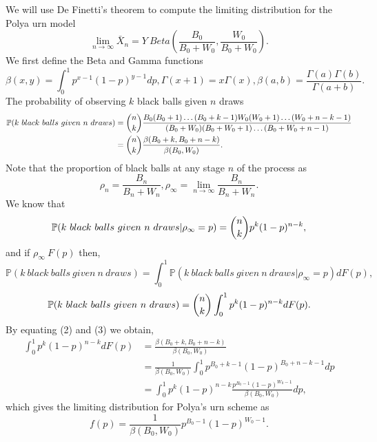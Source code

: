 \documentclass[a4paper,english,12pt]{article}
\begin{document}
We will use De Finetti's theorem to compute the limiting distribution for the Polya urn model 
\begin{equation*}
\lim_{n\to \infty} \bar{X}_n=Y~Beta\left(\frac{B_0}{B_0+W_0},\frac{W_0}{B_0+W_0} \right).
\end{equation*}
We first define the Beta and Gamma functions
\begin{equation*}
\beta(x,y)=\int_0^1 p^{x-1}(1-p)^{y-1}dp, \Gamma(x+1)=x\Gamma(x), \beta(a,b)=\frac{\Gamma(a)\Gamma(b)}{\Gamma(a+b)}.
\end{equation*}
The probability of observing $k$ black balls given $n$ draws
\begin{align}
\mathbb{P}(k\ black\  balls\ given\ n\ draws)&=\dbinom{n}{k}\frac{B_0(B_0+1)\dots(B_0+k-1)W_0(W_0+1)\dots(W_0+n-k-1)}{(B_0+W_0)(B_0+W_0+1)\dots(B_0+W_0+n-1)}\\
								&=\dbinom{n}{k}\frac{\beta(B_0+k,B_0+n-k)}{\beta(B_0,W_0)}.
\end{align}
Note that the proportion of black balls at any stage $n$ of the process as
\begin{equation*}
\rho_n=\frac{B_n}{B_n+W_n}, \rho_{\infty}=\lim_{n\to \infty}\frac{B_n}{B_n+W_n}.
\end{equation*}
We know that 
\begin{equation*}
\mathbb{P}(k\ black\  balls\ given\ n\ draws|\rho_{\infty}=p)=\dbinom{n}{k}p^k(1-p)^{n-k},
\end{equation*}
and if $\rho_{\infty}~F(p)$ then,
\begin{equation*}
\mathbb{P}(k\ black\  balls\ given\ n\ draws)=\int_0^1\mathbb{P}(k\ black\  balls\ given\ n\ draws|\rho_{\infty}=p)dF(p),
\end{equation*}
\begin{equation}
\mathbb{P}(k\ black\  balls\ given\ n\ draws)=\dbinom{n}{k} \int_0^1p^k(1-p)^{n-k}dF(p).
\end{equation}
By equating (2) and (3) we obtain,
\begin{align*}
\int_0^1 p^k(1-p)^{n-k}dF(p) &= \frac{\beta(B_0+k,B_0+n-k)}{\beta(B_0,W_0)}\\
					   &=\frac{1}{\beta(B_0,W_0)}\int_0^1p^{B_0+k-1}(1-p)^{B_0+n-k-1}dp\\
					   &=\int_0^1 p^k (1-p)^{n-k}\frac{p^{B_0-1}(1-p)^{W_0-1}}{\beta(B_0,W_0)}dp,
\end{align*}
which gives the limiting distribution for Polya's urn scheme as
\begin{equation*}
f(p)=\frac{1}{\beta(B_0,W_0)}p^{B_0-1}(1-p)^{W_0-1}.
\end{equation*}
\end{document}
